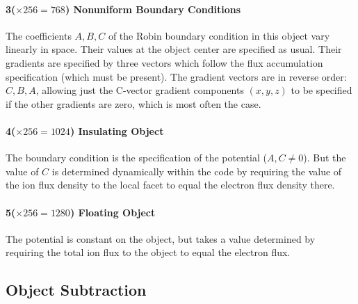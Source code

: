 \documentclass[12pt]{article}
\begin{document}
\paragraph{3($\times256=768$) Nonuniform Boundary Conditions} The
coefficients $A,B,C$ of the Robin boundary condition in this object vary
linearly in space. Their values at the object center are specified as
usual. Their gradients are specified by three vectors which follow the
flux accumulation specification (which must be present). The gradient
vectors are in reverse order: $C, B, A$, allowing just the C-vector
gradient components
$(x,y,z)$ to be specified if the other gradients are zero, which is
most often the case.

\paragraph{4($\times256=1024$) Insulating Object} The boundary
condition is the specification of the potential ($A,C\ne 0$). But the
value of $C$ is determined dynamically within the code by requiring
the value of the ion flux density to the local facet to equal the
electron flux density there.

\paragraph{5($\times256=1280$) Floating Object} The potential is constant
on the object, but takes a value determined by requiring the total ion
flux to the object to equal the electron flux.

\subsection{Object Subtraction}
\end{document}
